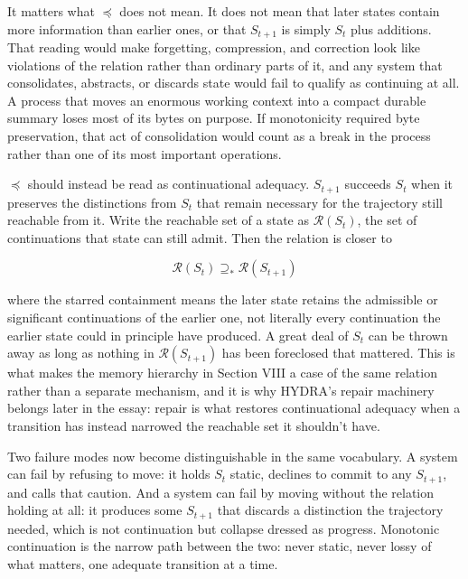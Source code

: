 \documentclass[11pt]{article}
\begin{document}
It matters what $\preceq$ does not mean. It does not mean that later states contain more information than earlier ones, or that $S_{t+1}$ is simply $S_t$ plus additions. That reading would make forgetting, compression, and correction look like violations of the relation rather than ordinary parts of it, and any system that consolidates, abstracts, or discards state would fail to qualify as continuing at all. A process that moves an enormous working context into a compact durable summary loses most of its bytes on purpose. If monotonicity required byte preservation, that act of consolidation would count as a break in the process rather than one of its most important operations.

$\preceq$ should instead be read as continuational adequacy. $S_{t+1}$ succeeds $S_t$ when it preserves the distinctions from $S_t$ that remain necessary for the trajectory still reachable from it. Write the reachable set of a state as $\mathcal{R}(S_t)$, the set of continuations that state can still admit. Then the relation is closer to

\[
\mathcal{R}(S_t) \supseteq_{*} \mathcal{R}(S_{t+1})
\]

where the starred containment means the later state retains the admissible or significant continuations of the earlier one, not literally every continuation the earlier state could in principle have produced. A great deal of $S_t$ can be thrown away as long as nothing in $\mathcal{R}(S_{t+1})$ has been foreclosed that mattered. This is what makes the memory hierarchy in Section VIII a case of the same relation rather than a separate mechanism, and it is why HYDRA's repair machinery belongs later in the essay: repair is what restores continuational adequacy when a transition has instead narrowed the reachable set it shouldn't have.

Two failure modes now become distinguishable in the same vocabulary. A system can fail by refusing to move: it holds $S_t$ static, declines to commit to any $S_{t+1}$, and calls that caution. And a system can fail by moving without the relation holding at all: it produces some $S_{t+1}$ that discards a distinction the trajectory needed, which is not continuation but collapse dressed as progress. Monotonic continuation is the narrow path between the two: never static, never lossy of what matters, one adequate transition at a time.
\end{document}
